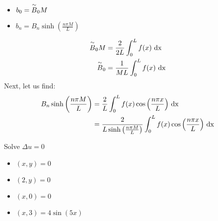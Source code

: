 \begin{enumerate}
\begin{itemize}
  \item $b_0 = \overset{\sim}{B}_0 M$
  \item $b_n = B_n \sinh\left( \frac{n \pi M}{L} \right)$
\end{itemize}
\begin{align}
  \overset{\sim}{B}_0 M & = \frac{2}{2L} \int^L_0 f(x) \text{ dx }\\
  \overset{\sim}{B}_0 & = \frac{1}{ML} \int^L_0 f(x) \text{ dx }
\end{align}
Next, let us find:
\begin{align}
  B_n \sinh\left( \frac{n \pi M}{L} \right) & = \frac{2}{L} \int^L_0 f(x) \cos \Big( \frac{n \pi x}{L} \Big) \text{ dx }\\
  & = \frac{2}{L \sinh\left( \frac{n \pi M}{L} \right)} \int^L_0 f(x) \cos \Big( \frac{n \pi x}{L} \Big) \text{ dx }
\end{align}
\end{enumerate}
\ex Solve $\Delta u = 0$
\begin{itemize}
  \item $(x, y) = 0$
  \item $(2, y) = 0$
  \item $(x, 0) = 0$
  \item $(x, 3) = 4 \sin (5x)$
\end{itemize}
